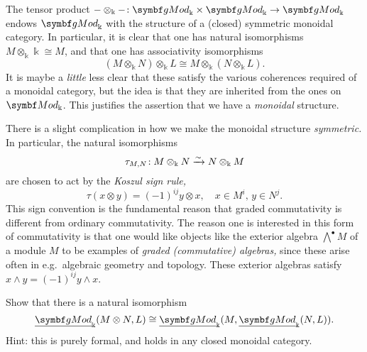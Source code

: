 The tensor product \(-\otimes_\Bbbk-\!:\gMod_\Bbbk\times\gMod_\Bbbk\to\gMod_\Bbbk\) endows \(\gMod_\Bbbk\) with the structure
of a (closed) symmetric monoidal category. In particular, it is clear that one has natural isomorphisms \(M\otimes_\Bbbk \Bbbk \cong M\),
and that one has associativity isomorphisms
\[ (M\otimes_\Bbbk N)\otimes_\Bbbk L \cong M\otimes_\Bbbk (N\otimes_\Bbbk L). \]
It is maybe a \emph{little} less clear that these satisfy the various coherences required of a monoidal category, but the idea is that
they are inherited from the ones on \(\Mod_\Bbbk\). This justifies the assertion that we have a \emph{monoidal} structure.

There is a slight complication in how we make the monoidal structure \emph{symmetric.} In particular, the natural isomorphisms
\[ \tau_{M,N}\!: M\otimes_\Bbbk N \xrightarrow{\sim} N\otimes_\Bbbk M \]
are chosen to act by the \emph{Koszul sign rule,}
\[ \tau(x\otimes y) = (-1)^{ij} y\otimes x, \quad x\in M^i,\, y\in N^j. \]
This sign convention is the fundamental reason that graded commutativity is different from ordinary commutativity. The reason one is
interested in this form of commutativity is that one would like objects like the exterior algebra \(\bigwedge^\bullet M\) of a module
\(M\) to be examples of \emph{graded (commutative) algebras,} since these arise often in e.g.\ algebraic geometry and topology. These
exterior algebras satisfy \(x\wedge y = (-1)^{ij}y\wedge x\).

\begin{exercise}
	Show that there is a natural isomorphism
	\[ \ugMod_\Bbbk(M\otimes N,L) \cong \ugMod_\Bbbk(M,\ugMod_\Bbbk(N,L)). \]
	Hint: this is purely formal, and holds in any closed monoidal category.
\end{exercise}

